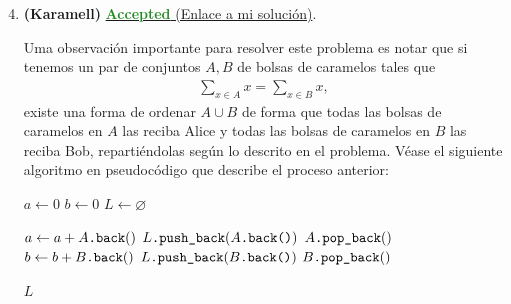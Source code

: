 \documentclass{article}
\begin{document}
    \begin{enumerate}[label=\textbf{Problema \arabic*}]
        \setcounter{enumi}{3}
        \item \textbf{(Karamell)} \href{https://codeforces.com/gym/105327/submission/376832433}{\textcolor{ForestGreen}{\textbf{Accepted}} (Enlace a mi solución)}.
        
        Uma observación importante para resolver este problema es notar que si tenemos un par de conjuntos $A, B$ de bolsas de caramelos tales que 
        \begin{align*}
            \sum_{x \in A}x = \sum_{x \in B} x, 
        \end{align*}
        existe una forma de ordenar $A\cup B$ de forma que todas las bolsas de caramelos en $A$ las reciba Alice y todas las bolsas de caramelos en $B$ las reciba Bob, repartiéndolas según lo descrito en el problema. Véase el siguiente algoritmo en pseudocódigo que describe el proceso anterior:

        \begin{algorithm}[H]
            \begin{algorithmic}[1]
                    \State $a \gets 0$
                    \State $b \gets 0$
                    \State $L \gets \varnothing$

                            \State $a \gets a + A\text{\texttt{.back}}()$
                            \State $L\text{\texttt{.push\_back}}(A\text{\texttt{.back()}})$
                            \State $A\text{\texttt{.pop\_back}}()$
                        \Else
                            \State $b \gets b + B\text{\texttt{.back}}()$
                            \State $L\text{\texttt{.push\_back}}(B\text{\texttt{.back()}})$
                            \State $B\text{\texttt{.pop\_back}}()$
                        \EndIf
                    \EndWhile

                    \Return $L$ 
                \EndProcedure
            \end{algorithmic}
        \end{algorithm}


\end{enumerate}
\end{document}
